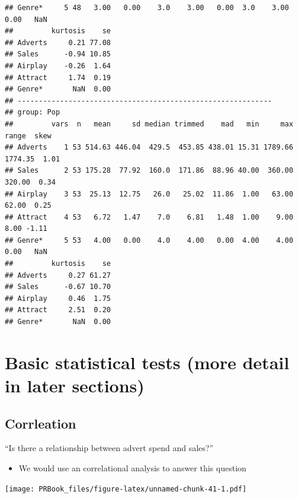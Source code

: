 \documentclass[
]{book}
\newenvironment{Shaded}{\begin{snugshade}}{\end{snugshade}}
\newcommand{\KeywordTok}[1]{\textcolor[rgb]{0.13,0.29,0.53}{\textbf{#1}}}
\newcommand{\NormalTok}[1]{#1}
\newcommand{\OperatorTok}[1]{\textcolor[rgb]{0.81,0.36,0.00}{\textbf{#1}}}
\providecommand{\tightlist}{%
  \setlength{\itemsep}{0pt}\setlength{\parskip}{0pt}}
\begin{document}
\begin{verbatim}
## Genre*     5 48   3.00   0.00    3.0    3.00   0.00  3.0    3.00    0.00   NaN
##         kurtosis    se
## Adverts     0.21 77.08
## Sales      -0.94 10.85
## Airplay    -0.26  1.64
## Attract     1.74  0.19
## Genre*       NaN  0.00
## ------------------------------------------------------------ 
## group: Pop
##         vars  n   mean     sd median trimmed    mad   min     max   range  skew
## Adverts    1 53 514.63 446.04  429.5  453.85 438.01 15.31 1789.66 1774.35  1.01
## Sales      2 53 175.28  77.92  160.0  171.86  88.96 40.00  360.00  320.00  0.34
## Airplay    3 53  25.13  12.75   26.0   25.02  11.86  1.00   63.00   62.00  0.25
## Attract    4 53   6.72   1.47    7.0    6.81   1.48  1.00    9.00    8.00 -1.11
## Genre*     5 53   4.00   0.00    4.0    4.00   0.00  4.00    4.00    0.00   NaN
##         kurtosis    se
## Adverts     0.27 61.27
## Sales      -0.67 10.70
## Airplay     0.46  1.75
## Attract     2.51  0.20
## Genre*       NaN  0.00
\end{verbatim}

\hypertarget{basic-statistical-tests-more-detail-in-later-sections}{%
\section{Basic statistical tests (more detail in later sections)}\label{basic-statistical-tests-more-detail-in-later-sections}}

\hypertarget{corrleation}{%
\subsection{Corrleation}\label{corrleation}}

``Is there a relationship between advert spend and sales?''

\begin{itemize}
\tightlist
\item
  We would use an correlational analysis to answer this question
\end{itemize}

\begin{Shaded}
\end{Shaded}

\texttt{[image: PRBook\_files/figure-latex/unnamed-chunk-41-1.pdf]}
\end{document}
